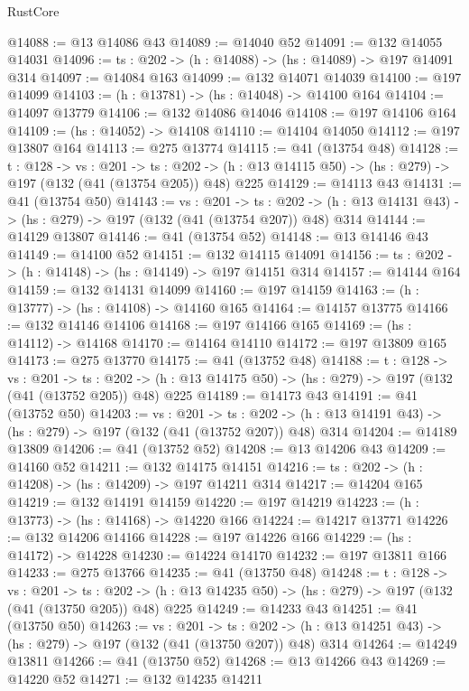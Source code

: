 \begin{lexlean}{RustCore}
\begin{coremodule}
@14088 := @13 @14086 @43
@14089 := @14040 @52
@14091 := @132 @14055 @14031
@14096 := {ts : @202} -> (h : @14088) -> (hs : @14089) -> @197 @14091 @314
@14097 := @14084 @163
@14099 := @132 @14071 @14039
@14100 := @197 @14099
@14103 := (h : @13781) -> (hs : @14048) -> @14100 @164
@14104 := @14097 @13779
@14106 := @132 @14086 @14046
@14108 := @197 @14106 @164
@14109 := (hs : @14052) -> @14108
@14110 := @14104 @14050
@14112 := @197 @13807 @164
@14113 := @275 @13774
@14115 := @41 (@13754 @48)
@14128 := {t : @128} ->
  {vs : @201} ->
  {ts : @202} -> (h : @13 @14115 @50) -> (hs : @279) -> @197 (@132 (@41 (@13754 @205)) @48) @225
@14129 := @14113 @43
@14131 := @41 (@13754 @50)
@14143 := {vs : @201} ->
  {ts : @202} -> (h : @13 @14131 @43) -> (hs : @279) -> @197 (@132 (@41 (@13754 @207)) @48) @314
@14144 := @14129 @13807
@14146 := @41 (@13754 @52)
@14148 := @13 @14146 @43
@14149 := @14100 @52
@14151 := @132 @14115 @14091
@14156 := {ts : @202} -> (h : @14148) -> (hs : @14149) -> @197 @14151 @314
@14157 := @14144 @164
@14159 := @132 @14131 @14099
@14160 := @197 @14159
@14163 := (h : @13777) -> (hs : @14108) -> @14160 @165
@14164 := @14157 @13775
@14166 := @132 @14146 @14106
@14168 := @197 @14166 @165
@14169 := (hs : @14112) -> @14168
@14170 := @14164 @14110
@14172 := @197 @13809 @165
@14173 := @275 @13770
@14175 := @41 (@13752 @48)
@14188 := {t : @128} ->
  {vs : @201} ->
  {ts : @202} -> (h : @13 @14175 @50) -> (hs : @279) -> @197 (@132 (@41 (@13752 @205)) @48) @225
@14189 := @14173 @43
@14191 := @41 (@13752 @50)
@14203 := {vs : @201} ->
  {ts : @202} -> (h : @13 @14191 @43) -> (hs : @279) -> @197 (@132 (@41 (@13752 @207)) @48) @314
@14204 := @14189 @13809
@14206 := @41 (@13752 @52)
@14208 := @13 @14206 @43
@14209 := @14160 @52
@14211 := @132 @14175 @14151
@14216 := {ts : @202} -> (h : @14208) -> (hs : @14209) -> @197 @14211 @314
@14217 := @14204 @165
@14219 := @132 @14191 @14159
@14220 := @197 @14219
@14223 := (h : @13773) -> (hs : @14168) -> @14220 @166
@14224 := @14217 @13771
@14226 := @132 @14206 @14166
@14228 := @197 @14226 @166
@14229 := (hs : @14172) -> @14228
@14230 := @14224 @14170
@14232 := @197 @13811 @166
@14233 := @275 @13766
@14235 := @41 (@13750 @48)
@14248 := {t : @128} ->
  {vs : @201} ->
  {ts : @202} -> (h : @13 @14235 @50) -> (hs : @279) -> @197 (@132 (@41 (@13750 @205)) @48) @225
@14249 := @14233 @43
@14251 := @41 (@13750 @50)
@14263 := {vs : @201} ->
  {ts : @202} -> (h : @13 @14251 @43) -> (hs : @279) -> @197 (@132 (@41 (@13750 @207)) @48) @314
@14264 := @14249 @13811
@14266 := @41 (@13750 @52)
@14268 := @13 @14266 @43
@14269 := @14220 @52
@14271 := @132 @14235 @14211

\end{coremodule}
\end{lexlean}
